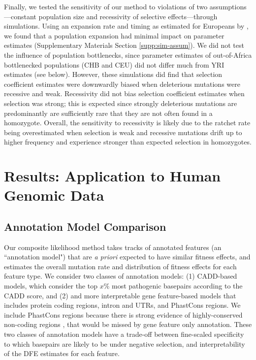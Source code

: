 \documentclass[11pt]{article}
\begin{document}
Finally, we tested the sensitivity of our method to violations of two
assumptions---constant population size and recessivity of selective
effects---through simulations. Using an expansion rate and timing as estimated
for Europeans by \textcite{Gutenkunst2009-pg}, we found that a population
expansion had minimal impact on parameter estimates (Supplementary Materials
Section \ref{supp:sim-assum}). We did not test the influence of population
bottlenecks, since parameter estimates of out-of-Africa bottlenecked
populations (CHB and CEU) did not differ much from YRI estimates (see below).
However, these simulations did find that selection coefficient estimates were
downwardly biased when deleterious mutations were recessive and weak.
Recessivity did not bias selection coefficient estimates when selection was
strong; this is expected since strongly deleterious mutations are predominantly
are sufficiently rare that they are not often found in a homozygote. Overall,
the sensitivity to recessivity is likely due to the ratchet rate being
overestimated when selection is weak and recessive mutations drift up to higher
frequency and experience stronger than expected selection in homozygotes.

\section*{Results: Application to Human Genomic Data}

\subsection*{Annotation Model Comparison}
\label{sec:annotation}

Our composite likelihood method takes tracks of annotated features (an
``annotation model") that are \emph{a priori} expected to have similar fitness
effects, and estimates the overall mutation rate and distribution of fitness
effects for each feature type. We consider two classes of annotation models:
(1) CADD-based models, which consider the top $x\%$ most pathogenic basepairs
according to the CADD score, and (2) and more interpretable gene feature-based
models that includes protein coding regions, intron and UTRs, and PhastCons
regions. We include PhastCons regions because there is strong evidence of
highly-conserved non-coding regions
\parencite{Meader2010-hm,Harmston2013-tt,Katzman2007-gq,Siepel2005-wh}, that
would be missed by gene feature only annotation. These two classes of
annotation models have a trade-off between fine-scaled specificity to which
basepairs are likely to be under negative selection, and interpretability of
the DFE estimates for each feature.
\end{document}
